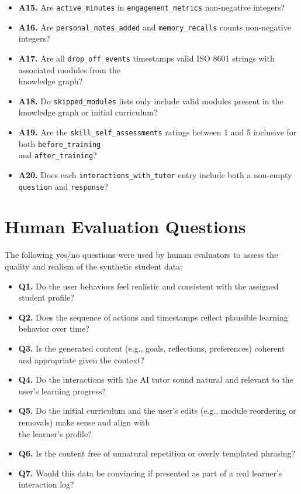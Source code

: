 {\begin{itemize}
    \item \textbf{A15.} Are \texttt{active\_minutes} in \texttt{engagement\_metrics} non-negative integers?
    \item \textbf{A16.} Are \texttt{personal\_notes\_added} and \texttt{memory\_recalls} counts non-negative integers?
    \item \textbf{A17.} Are all \texttt{drop\_off\_events} timestamps valid ISO 8601 strings with associated modules from the \\knowledge graph?
    \item \textbf{A18.} Do \texttt{skipped\_modules} lists only include valid modules present in the knowledge graph or initial curriculum?
    \item \textbf{A19.} Are the \texttt{skill\_self\_assessments} ratings between 1 and 5 inclusive for both \texttt{before\_training} \\and \texttt{after\_training}?
    \item \textbf{A20.} Does each \texttt{interactions\_with\_tutor} entry include both a non-empty \texttt{question} and \texttt{response}?
\end{itemize}
}


\section{Human Evaluation Questions}
\label{appendix:questions}

The following yes/no questions were used by human evaluators to assess the quality and realism of the synthetic student data:

{\footnotesize
\begin{itemize}
    \item \textbf{Q1.} Do the user behaviors feel realistic and consistent with the assigned student profile?
    \item \textbf{Q2.} Does the sequence of actions and timestamps reflect plausible learning behavior over time?
    \item \textbf{Q3.} Is the generated content (e.g., goals, reflections, preferences) coherent and appropriate given the context?
    \item \textbf{Q4.} Do the interactions with the AI tutor sound natural and relevant to the user's learning progress?
    \item \textbf{Q5.} Do the initial curriculum and the user's edits (e.g., module reordering or removals) make sense and align with \\the learner's profile?
    \item \textbf{Q6.} Is the content free of unnatural repetition or overly templated phrasing?
    \item \textbf{Q7.} Would this data be convincing if presented as part of a real learner's interaction log?
\end{itemize}
}
